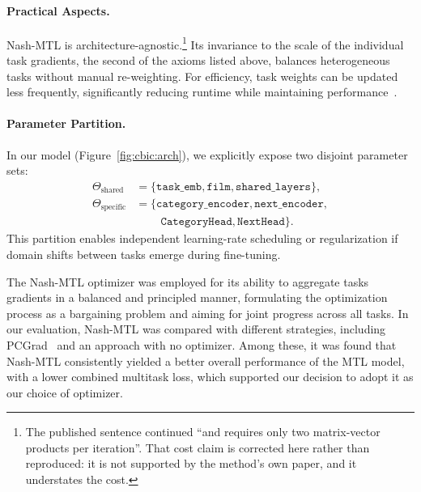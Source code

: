 \paragraph*{Practical Aspects.}
Nash-MTL is architecture-agnostic.\footnote{The published sentence continued ``and requires only two
matrix-vector products per iteration''. That cost claim is corrected here rather than reproduced: it
is not supported by the method's own paper, and it understates the cost.} Its invariance to the scale of the individual task gradients, the second of the axioms listed above, balances heterogeneous tasks without manual re-weighting. For efficiency, task weights can be updated less frequently, significantly reducing runtime while maintaining performance~\cite{nash}.

\paragraph*{Parameter Partition.}
In our model (Figure~\ref{fig:cbic:arch}), we explicitly expose two disjoint parameter sets:
\[
  \begin{aligned}
    \Theta_{\text{shared}}   &= \{\texttt{task\_emb},\texttt{film},\texttt{shared\_layers}\},\\
    \Theta_{\text{specific}} &= \{\texttt{category\_encoder},\texttt{next\_encoder},\\
                             &\qquad\ \texttt{CategoryHead},\texttt{NextHead}\}.
  \end{aligned}
\]
This partition enables independent learning-rate scheduling or regularization if domain shifts between tasks emerge during fine-tuning.

The Nash-MTL optimizer was employed for its ability to aggregate tasks gradients in a balanced and principled manner, formulating the optimization process as a bargaining problem and aiming for joint progress across all tasks. In our evaluation, Nash-MTL was compared with different strategies, including PCGrad~\cite{yu2020pcgrad} and an approach with no optimizer. Among these, it was found that Nash-MTL consistently yielded a better overall performance of the MTL model, with a lower combined multitask loss, which supported our decision to adopt it as our choice of optimizer.
